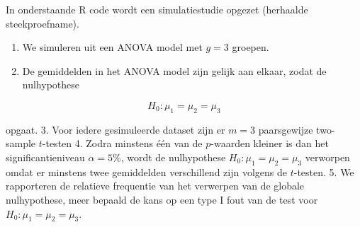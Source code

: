 \documentclass[
  12pt,dutch,coursenotes]{book}
\providecommand{\tightlist}{%
  \setlength{\itemsep}{0pt}\setlength{\parskip}{0pt}}
\theoremstyle{definition}
\theoremstyle{definition}
\theoremstyle{definition}
\theoremstyle{remark}
\begin{document}
In onderstaande R code wordt een simulatiestudie opgezet (herhaalde steekproefname).

\begin{enumerate}
\def\labelenumi{\arabic{enumi}.}
\tightlist
\item
  We simuleren uit een ANOVA model met \(g=3\) groepen.
\item
  De gemiddelden in het ANOVA model zijn gelijk aan elkaar, zodat de nulhypothese
\end{enumerate}

\[H_0: \mu_1=\mu_2=\mu_3\]

opgaat.
3. Voor iedere gesimuleerde dataset zijn er \(m=3\) paarsgewijze two-sample \(t\)-testen
4. Zodra minstens één van de \(p\)-waarden kleiner is dan het significantieniveau \(\alpha=5\%\), wordt de nulhypothese \(H_0: \mu_1=\mu_2=\mu_3\) verworpen omdat er minstens twee gemiddelden verschillend zijn volgens de \(t\)-testen.
5. We rapporteren de relatieve frequentie van het verwerpen van de globale nulhypothese, meer bepaald de kans op een type I fout van de test voor \(H_0: \mu_1=\mu_2=\mu_3\).
\end{document}
